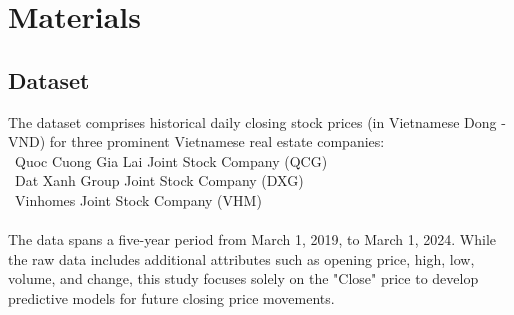 \documentclass{ieeeojies}
\begin{document}
\section{Materials}
\subsection{Dataset}

The dataset comprises historical daily closing stock prices (in Vietnamese Dong - VND) for three prominent Vietnamese real estate companies:
 \\
  \indent\textbullet\ Quoc Cuong Gia Lai Joint Stock Company (QCG) \\
  \indent\textbullet\ Dat Xanh Group Joint Stock Company (DXG) \\
  \indent\textbullet\ Vinhomes Joint Stock Company (VHM) \\
  \\
The data spans a five-year period from March 1, 2019, to March 1, 2024.  While the raw data includes additional attributes such as opening price, high, low, volume, and change, this study focuses solely on the "Close" price to develop predictive models for future closing price movements.
\end{document}

